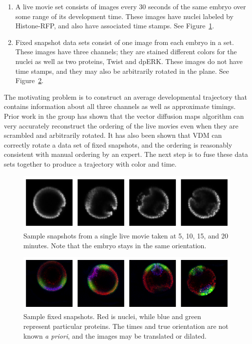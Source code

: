 \documentclass[12pt]{article}
\begin{document}
\begin{enumerate}
\item A live movie set consists of images every 30 seconds of the same embryo over some range of its development time. These images have nuclei labeled by Histone-RFP, and also have associated time stamps. See Figure~\ref{fig:live}.
\item Fixed snapshot data sets consist of one image from each embryo in a set. These images have three channels; they are stained different colors for the nuclei as well as two proteins, Twist and dpERK. These images do not have time stamps, and they may also be arbitrarily rotated in the plane. See Figure~\ref{fig:fixed}.
\end{enumerate}

The motivating problem is to construct an average developmental trajectory that contains information about all three channels as well as approximate timings. Prior work in the group has shown that the vector diffusion maps algorithm can very accurately reconstruct the ordering of the live movies even when they are scrambled and arbitrarily rotated. It has also been shown that VDM can correctly rotate a data set of fixed snapshots, and the ordering is reasonably consistent with manual ordering by an expert. The next step is to fuse these data sets together to produce a trajectory with color and time.

\def\livegraphic{\includegraphics[width=\linewidth]{figures/live}}
\begin{figure}[h]
\livegraphic
\caption{Sample snapshots from a single live movie taken at 5, 10, 15, and 20 minutes. Note that the embryo stays in the same orientation.}
\label{fig:live}
\end{figure}
\newlength{\liveheight}
\settoheight{\liveheight}{\livegraphic}

\begin{figure}[h]
\includegraphics[width=\linewidth]{figures/fixed}
\caption{Sample fixed snapshots. Red is nuclei, while blue and green represent particular proteins. The times and true orientation are not known \textit{a priori}, and the images may be translated or dilated.}
\label{fig:fixed}
\end{figure}
\end{document}
